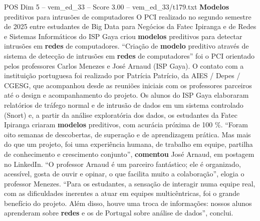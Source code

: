 \begin{textsample}{POS Dim 5 – vem\_ed\_33 – Score 3.00 – vem\_ed\_33/t179.txt}  \label{ex:f5_pos_101}
\textbf{Modelos} preditivos para intrusões de computadores O PCI realizado no segundo semestre de 2025 entre estudantes de Big Data para Negócios da Fatec Ipiranga e de Redes e Sistemas Informáticos do ISP Gaya criou \textbf{modelos} preditivos para detectar intrusões em \textbf{redes} de computadores. “Criação de \textbf{modelo} preditivo através de sistema de detecção de intrusões em \textbf{redes} de computadores” foi o PCI orientado pelos professores Carlos Menezes e José Arnaud (ISP Gaya).
O contato com a instituição portuguesa foi realizado por Patrícia Patrício, da AIES / Depes / CGESG, que acompanhou desde as reuniões iniciais com os professores parceiros até o design e acompanhamento do projeto.
Os alunos do ISP Gaya elaboraram relatórios de tráfego normal e de intrusão de dados em um sistema controlado (Snort) e, a partir da análise exploratória dos dados, os estudantes da Fatec Ipiranga criaram \textbf{modelos} preditivos, com acurácia próxima de 100 \%. “Foram oito semanas de descobertas, de superação e de aprendizagem prática.
Mas mais do que um projeto, foi uma experiência humana, de trabalho em equipe, partilha de conhecimento e crescimento conjunto”, \textbf{comentou} José Arnaud, em postagem no LinkedIn. “O professor Arnaud é um parceiro fantástico; ele é organizado, acessível, gosta de ouvir e opinar, o que facilita muito a colaboração”, elogia o professor Menezes. “Para os estudantes, a sensação de interagir numa equipe real, com as dificuldades inerentes a atuar em equipes multicêntricas, foi o grande benefício do projeto.
Além disso, houve uma troca de informações: nossos alunos aprenderam sobre \textbf{redes} e os de Portugal sobre análise de dados”, conclui.

\end{textsample}
